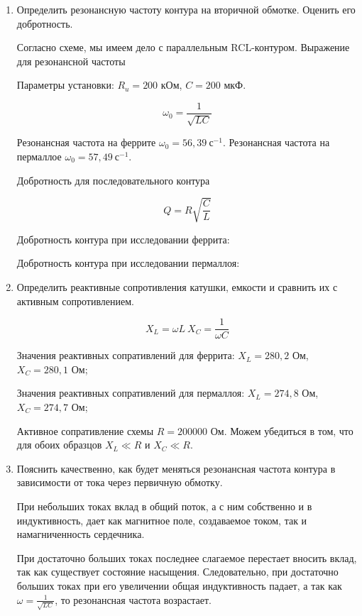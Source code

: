 \begin{enumerate}
	

	\item Определить резонансную частоту контура на вторичной обмотке. Оценить его добротность.
	
	Согласно схеме, мы имеем дело с параллельным RCL-контуром. Выражение для резонансной частоты
    
	Параметры установки: $R_u = 200$ кОм, $C = 200$ мкФ.

	\begin{equation}
		\omega_0 = \frac{1}{\sqrt{LC}}
	\end{equation}

	Резонансная частота на феррите $\omega_0 = 56,39 ~ \text{с}^{-1}$.
	Резонансная частота на пермаллое $\omega_0 = 57,49 ~ \text{с}^{-1}$.
	
	Добротность для последовательного контура
	
	\begin{equation}
		Q = R \sqrt{\frac{C}{L}}
	\end{equation}

	Добротность контура при исследовании феррита:
	
	\begin{center}
	\end{center}

	Добротность контура при исследовании пермаллоя:
	
	\begin{center}
	\end{center}

	\item Определить реактивные сопротивления катушки, емкости и сравнить их с активным сопротивлением.

	\begin{equation}
		X_L = \omega L ~ X_C = \frac{1}{\omega C}
	\end{equation}

	Значения реактивных сопративлений для феррита: $X_L = 280,2$ Ом, $X_C = 280,1$ Ом;

	Значения реактивных сопративлений для пермаллоя: $X_L = 274,8$ Ом, $X_C = 274,7$ Ом;

	Активное сопративление схемы $R = 200000$ Ом. Можем убедиться в том, что
	для обоих образцов $X_L \ll R$ и $X_C \ll R$.

	\item Пояснить качественно, как будет меняться резонансная частота контура в зависимости от тока через первичную обмотку.
	
	При небольших токах вклад в общий поток, а с ним собственно и
	в индуктивность, дает как магнитное поле, создаваемое током, так и
	намагниченность сердечника.

	При достаточно больших токах последнее слагаемое перестает вносить вклад, так как существует состояние насыщения. Следовательно,
	при достаточно больших токах при его увеличении общая индуктивность
	падает, а так как $\omega = \frac{1}{\sqrt{LC}}$, то резонансная частота возрастает.

\end{enumerate}


